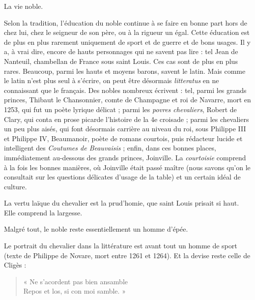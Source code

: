 \documentclass[french,twoside]{book} %
\newcommand{\labelchar}[1]{{\color{rubric}\bf #1}}
\begin{document}
\bigbreak
\noindent \labelchar{c)} La vie noble.\par
Selon la tradition, l’éducation du noble continue à se faire en bonne part hors de chez lui, chez le seigneur de son père, ou à la rigueur un égal. Cette éducation est de plus en plus rarement uniquement de sport et de guerre et de bons usages. Il y a, à vrai dire, encore de hauts personnages qui ne savent pas lire : tel Jean de Nanteuil, chambellan de France sous saint Louis. Ces cas sont de plus en plus rares. Beaucoup, parmi les hauts et moyens barons, savent le latin. Mais comme le latin n’est plus seul à s’écrire, on peut être désormais \emph{litteratus} en ne connaissant que le français. Des nobles nombreux écrivent : tel, parmi les grands princes, Thibaut le Chansonnier, comte de Champagne et roi de Navarre, mort en 1253, qui fut un poète lyrique délicat ; parmi les \emph{povres chevaliers}, Robert de Clary, qui conta en prose picarde l’histoire de la 4e croisade ; parmi les chevaliers un peu plus aisés, qui font désormais carrière au niveau du roi, sous Philippe III et Philippe IV, Beaumanoir, poète de romans courtois, puis rédacteur lucide et intelligent des {\itshape Coutumes de Beauvaisis} ; enfin, dans ces bonnes places, immédiatement au-dessous des grands princes, Joinville. La \emph{courtoisie} comprend à la fois les bonnes manières, où Joinville était passé maître (nous savons qu’on le consultait sur les questions délicates d’usage de la table) et un certain idéal de culture.\par
\label{p69} La vertu laïque du chevalier est la prud’homie, que saint Louis prisait si haut. Elle comprend la largesse.\par
Malgré tout, le noble reste essentiellement un homme d’épée.\par
Le portrait du chevalier dans la littérature est avant tout un homme de sport (texte de Philippe de Novare, mort entre 1261 et 1264). Et la devise reste celle de Cligès :\par


\begin{verse}
« Ne s’acordent pas bien ansamble\\
Repos et los, si con moi samble. »\\
\end{verse}
\end{document}

